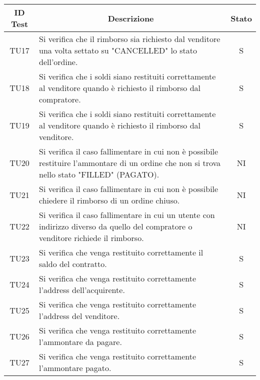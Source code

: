 \begin{table}[H]
  \centering
  \renewcommand{\arraystretch}{1.8}
  \begin{tabular}{c|p{10cm}|c}
    \rowcolor[HTML]{125E28}
    \color[HTML]{FFFFFF}\textbf{ID Test}
         & \multicolumn{1}{c}{\color[HTML]{FFFFFF}\textbf{Descrizione}}
         & \color[HTML]{FFFFFF}\textbf{Stato}                                                                                                               \\
    \hline
    TU17 & Si verifica che il rimborso sia richiesto dal venditore una volta settato su "CANCELLED" lo stato dell'ordine.                              & S  \\
    TU18 & Si verifica che i soldi siano restituiti correttamente al venditore quando è richiesto il rimborso dal compratore.                          & S  \\
    TU19 & Si verifica che i soldi siano restituiti correttamente al venditore quando è richiesto il rimborso dal venditore.                           & S  \\
    TU20 & Si verifica il caso fallimentare in cui non è possibile restituire l'ammontare di un ordine che non si trova nello stato "FILLED" (PAGATO). & NI \\
    TU21 & Si verifica il caso fallimentare in cui non è possibile chiedere il rimborso di un ordine chiuso.                                           & NI \\
    TU22 & Si verifica il caso fallimentare in cui un utente con indirizzo diverso da quello del compratore o venditore richiede il rimborso.          & NI \\
    TU23 & Si verifica che venga restituito correttamente il saldo del contratto.                                                                      & S  \\
    TU24 & Si verifica che venga restituito correttamente l'address dell'acquirente.                                                                   & S  \\
    TU25 & Si verifica che venga restituito correttamente l'address del venditore.                                                                     & S  \\
    TU26 & Si verifica che venga restituito correttamente l'ammontare da pagare.                                                                       & S  \\
    TU27 & Si verifica che venga restituito correttamente l'ammontare pagato.                                                                          & S  \\

\end{tabular}
\end{table}
